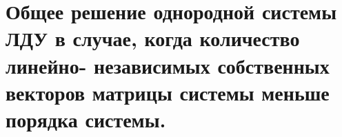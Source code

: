 {
	\section{Общее решение однородной системы ЛДУ в случае, когда количество линейно-
	независимых собственных векторов матрицы системы меньше порядка системы.}

	\newpage
}